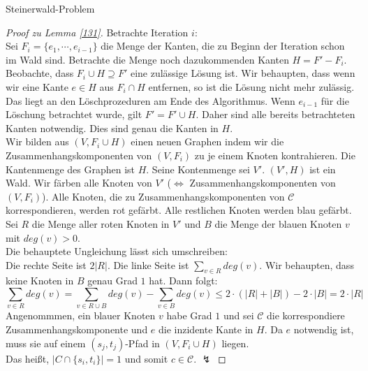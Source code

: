 \begin{section}{Steinerwald-Problem}
 \begin{proof}[Proof zu Lemma \ref{131}]
  Betrachte Iteration $i$:\\
  Sei $F_i = \{e_1,\cdots,e_{i-1}\}$ die Menge der Kanten, die zu Beginn der Iteration schon im Wald sind. Betrachte die Menge noch dazukommenden Kanten $H=F'-F_i$. Beobachte, dass $F_i \cup H \supseteq F'$ eine zulässige Lösung ist. Wir behaupten, dass wenn wir eine Kante $e\in H$ aus $F_i \cap H$ entfernen, so ist die Lösung nicht mehr zulässig. Das liegt an den Löschprozeduren am Ende des Algorithmus. Wenn $e_{i-1}$ für die Löschung betrachtet wurde, gilt $F' = F' \cup H$. Daher sind alle bereits betrachteten Kanten notwendig. Dies sind genau die Kanten in $H$.\\
  Wir bilden aus $(V,F_i \cup H)$ einen neuen Graphen indem wir die Zusammenhangskomponenten von $(V,F_i)$ zu je einem Knoten kontrahieren. Die Kantenmenge des Graphen ist $H$. Seine Kontenmenge sei $V'$. $(V',H)$ ist ein Wald. Wir färben alle Knoten von $V'$ ($\Leftrightarrow$ Zusammenhangskomponenten von $(V,F_i)$). Alle Knoten, die zu Zusammenhangskomponenten von $\mathcal{C}$ korrespondieren, werden rot gefärbt. Alle restlichen Knoten werden blau gefärbt. Sei $R$ die Menge aller roten Knoten in $V'$ und $B$ die Menge der blauen Knoten $v$ mit $deg(v) > 0$.\\
  Die behauptete Ungleichung lässt sich umschreiben:\\
  Die rechte Seite ist $2|R|$. Die linke Seite ist $\sum_{v\in R} deg(v)$. Wir behaupten, dass keine Knoten in $B$ genau Grad $1$ hat. Dann folgt:
  \[\sum_{v\in R} deg(v) = \sum_{v \in R \cup B} deg(v) -\sum_{v \in B} deg(v)\leq 2\cdot(|R|+|B|) - 2 \cdot |B| = 2 \cdot |R|\]
  Angenommmen, ein blauer Knoten $v$ habe Grad $1$ und sei $\mathcal{C}$ die korrespondiere Zusammenhangskomponente und $e$ die inzidente Kante in $H$. Da $e$ notwendig ist, muss sie auf einem $(s_j,t_j)$-Pfad in $(V,F_i\cup H)$ liegen.\\
  Das heißt, $|C \cap \{s_i,t_i\}| = 1$ und somit $c \in \mathcal{C}$. $\lightning$
 \end{proof}
\end{section}